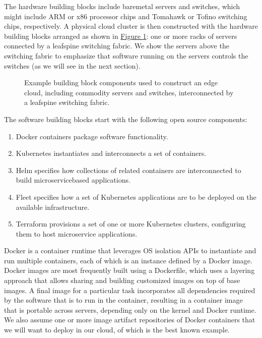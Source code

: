\documentclass[a4paper,11pt,english]{sphinxmanual}
\let\sphinxpxdimen\pdfpxdimen\else\newdimen\sphinxpxdimen
\begin{document}
\sphinxAtStartPar
The hardware building blocks include bare\sphinxhyphen{}metal servers and switches,
which might include ARM or x86 processor chips and Tomahawk or Tofino
switching chips, respectively. A physical cloud cluster is then
constructed with the hardware building blocks arranged as shown in
\hyperref[\detokenize{cloud:fig-hw}]{Figure \ref{\detokenize{cloud:fig-hw}}}: one or more racks of servers connected
by a leaf\sphinxhyphen{}spine switching fabric. We show the servers above the
switching fabric to emphasize that software running on the servers
controls the switches (as we will see in the next section).

\begin{figure}[ht]
\centering
\capstart

\noindent\sphinxincludegraphics[width=400\sphinxpxdimen]{{Slide41}.png}
\caption{Example building block components used to construct an edge cloud,
including commodity servers and switches, interconnected by a
leaf\sphinxhyphen{}spine switching fabric.}\label{\detokenize{cloud:id1}}\label{\detokenize{cloud:fig-hw}}\end{figure}

\sphinxAtStartPar
The software building blocks start with the following open source
components:
\begin{enumerate}
%
\item {} 
\sphinxAtStartPar
Docker containers package software functionality.

\item {} 
\sphinxAtStartPar
Kubernetes instantiates and interconnects a set of containers.

\item {} 
\sphinxAtStartPar
Helm specifies how collections of related containers are
interconnected to build microservice\sphinxhyphen{}based applications.

\item {} 
\sphinxAtStartPar
Fleet specifies how a set of Kubernetes applications are to be
deployed on the available infrastructure.

\item {} 
\sphinxAtStartPar
Terraform provisions a set of one or more Kubernetes clusters,
configuring them to host microservice applications.

\end{enumerate}

\sphinxAtStartPar
Docker is a container runtime that leverages OS isolation APIs to
instantiate and run multiple containers, each of which is an instance
defined by a Docker image. Docker images are most frequently built
using a Dockerfile, which uses a layering approach that allows sharing
and building customized images on top of base images. A final image
for a particular task incorporates all dependencies required by the
software that is to run in the container, resulting in a container
image that is portable across servers, depending only on the kernel
and Docker runtime. We also assume one or more image artifact
repositories of Docker containers that we will want to deploy in our
cloud, of which  is the best known
example.
\end{document}
